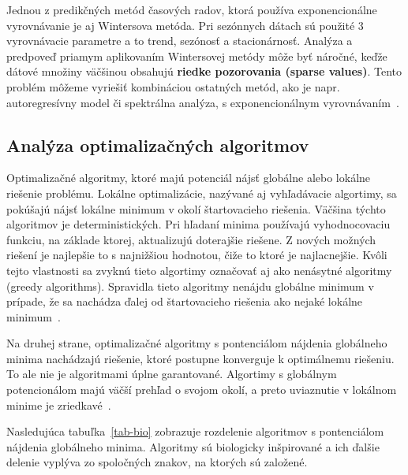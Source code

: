 \documentclass[a4paper,slovak,12pt,appendix]{article}
\begin{document}
Jednou z predikčných metód časových radov, ktorá používa exponencionálne
vyrovnávanie je aj Wintersova metóda. Pri sezónnych dátach sú použité 3
vyrovnávacie parametre a to trend, sezónosť a stacionárnosť. Analýza
a predpoveď priamym aplikovaním Wintersovej metódy môže byť náročné, keďže
dátové množiny väčšinou obsahujú \textbf{riedke pozorovania (sparse values)}.
Tento problém môžeme vyriešiť kombináciou ostatných metód, ako je napr.
autoregresívny model či spektrálna analýza, s exponencionálnym
vyrovnávaním~\cite{Mahalakshmi2016}.


\subsection{Analýza optimalizačných algoritmov}
Optimalizačné algoritmy, ktoré majú potenciál nájsť globálne alebo lokálne
riešenie problému. Lokálne optimalizácie, nazývané aj vyhľadávacie algortimy,
sa pokúšajú nájsť lokálne minimum v okolí štartovacieho riešenia. Väčšina
týchto algoritmov je deterministických. Pri hľadaní minima používajú
vyhodnocovaciu funkciu, na základe ktorej, aktualizujú doterajšie riešene.
Z nových možných riešení je najlepšie to s najnižšiou hodnotou, čiže to ktoré
je najlacnejšie. Kvôli tejto vlastnosti sa zvyknú tieto algortimy označovať aj
ako nenásytné algoritmy (greedy algorithms). Spravidla tieto algoritmy nenájdu
globálne minimum v prípade, že sa nachádza ďalej od štartovacieho riešenia ako
nejaké lokálne minimum~\cite{Sen1995}.

Na druhej strane, optimalizačné algoritmy s pontenciálom nájdenia globálneho
minima nachádzajú riešenie, ktoré postupne konverguje k optimálnemu riešeniu.
To ale nie je algoritmami úplne garantované. Algortimy s globálnym
potencionálom majú väčší prehľad o svojom okolí, a preto uviaznutie v lokálnom
minime je zriedkavé~\cite{Sen1995}.

Nasledujúca tabuľka~\ref{tab-bio} zobrazuje rozdelenie algoritmov
s pontenciálom nájdenia globálneho minima. Algoritmy sú biologicky inšpirované
a ich ďalšie delenie vyplýva zo spoločných znakov, na ktorých sú založené.
\end{document}
